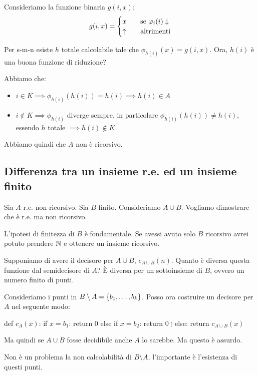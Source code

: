 Consideriamo la funzione binaria $g(i,x)$:
\begin{equation*}
    g(i,x) =
    \begin{cases}
        x \quad &\text{se $\varphi_{i}(i) \downarrow$} \\
        \uparrow \quad &\text{altrimenti}
    \end{cases}
\end{equation*}

Per s-m-n esiste $h$ totale calcolabile tale che $\phi_{h(i)}(x) = g(i,x)$. Ora, $h(i)$ è una buona funzione di
riduzione?

Abbiamo che:
\begin{itemize}
    \item $i \in K \implies \phi_{h(i)}(h(i)) = h(i) \implies h(i) \in A$
    \item $i \notin K \implies \phi_{h(i)}$ diverge sempre, in particolare $\phi_{h(i)}(h(i)) \not=
    h(i)$, essendo $h$ totale $ \implies h(i) \notin K$
\end{itemize}

Abbiamo quindi che $A$ non è ricorsivo.

\subsection{Differenza tra un insieme r.e. ed un insieme finito}

Sia $A$ r.e. non ricorsivo. Sia $B$ finito. Consideriamo $A \cup B$. Vogliamo dimostrare che è r.e.
ma non ricorsivo.

L'ipotesi di finitezza di $B$ è fondamentale. Se avessi avuto solo $B$ ricorsivo avrei potuto prendere
$\mathbb{N}$ e ottenere un insieme ricorsivo.

Supponiamo di avere il decisore per $A \cup B$, $c_{A \cup B}(n)$. Quanto è diversa questa funzione dal
semidecisore di $A$? È diversa per un sottoinsieme di $B$, ovvero un numero finito di punti.

Consideriamo i punti in $B \setminus A = \{b_{1},\dotsc,b_{k}\}$. Posso ora costruire un decisore
per $A$ nel seguente modo:
\begin{python}
def $c_{A}(x)$:
    if $x = b_{1}$:
        return 0
    else if $x = b_{2}$:
        return 0
    $\vdots$
    else:
        return $c_{A \cup B}(x)$
\end{python}

Ma quindi se $A \cup B$ fosse decidibile anche $A$ lo sarebbe. Ma questo è assurdo.

Non è un problema la non calcolabilità di $B \setminus A$, l'importante è l'esistenza di questi
punti.

